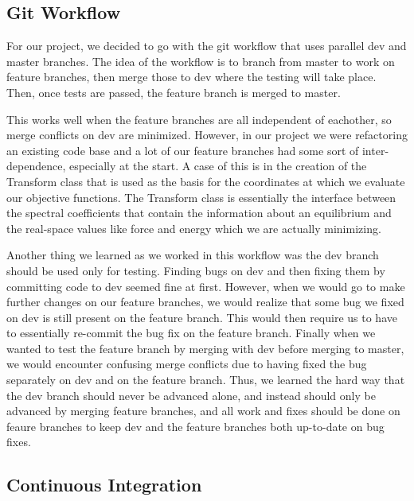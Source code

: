 \documentclass{article}
\begin{document}
\subsection{Git Workflow}

For our project, we decided to go with the git workflow that uses parallel dev and master branches.
The idea of the workflow is to branch from master to work on feature branches, then merge those to dev where the testing will take place.
Then, once tests are passed, the feature branch is merged to master.

This works well when the feature branches are all independent of eachother, so merge conflicts on dev are minimized.
However, in our project we were refactoring an existing code base and a lot of our feature branches had some sort of inter-dependence, especially at the start.
A case of this is in the creation of the Transform class that is used as the basis for the coordinates at which we evaluate our objective functions.
The Transform class is essentially the interface between the spectral coefficients that contain the information about an equilibrium and the real-space values like force and energy which we are actually minimizing.

Another thing we learned as we worked in this workflow was the dev branch should be used only for testing.
Finding bugs on dev and then fixing them by committing code to dev seemed fine at first.
However, when we would go to make further changes on our feature branches, we would realize that some bug we fixed on dev is still present on the feature branch.
This would then require us to have to essentially re-commit the bug fix on the feature branch.
Finally when we wanted to test the feature branch by merging with dev before merging to master, we would encounter confusing merge conflicts due to having fixed the bug separately on dev and on the feature branch.
Thus, we learned the hard way that the dev branch should never be advanced alone, and instead should only be advanced by merging feature branches, and all work and fixes should be done on feaure branches to keep dev and the feature branches both up-to-date on bug fixes.

\subsection{Continuous Integration}
\end{document}
